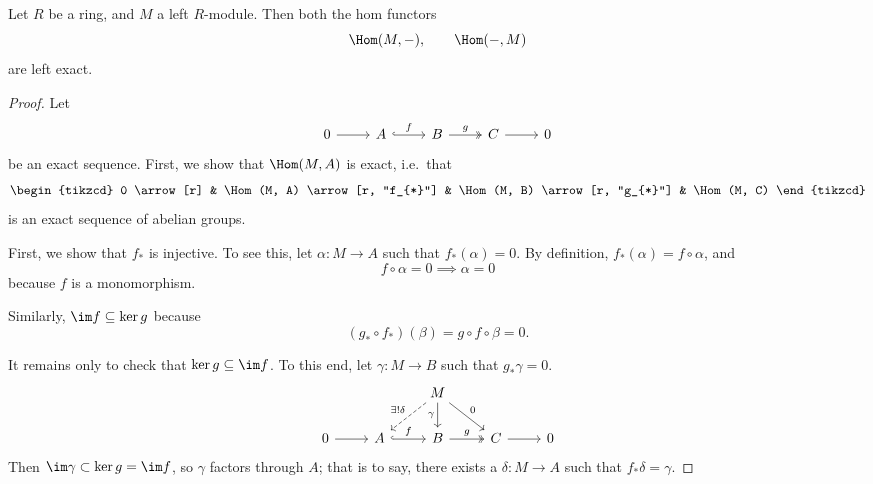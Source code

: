 \documentclass[main.tex]{subfiles}
\begin{document}
\begin{proposition}
  \label{prop:hom_functor_left_exact}
  Let $R$ be a ring, and $M$ a left $R$-module. Then both the hom functors
  \begin{equation*}
    \Hom(M, -),\qquad \Hom(-, M)
  \end{equation*}
  are left exact.
\end{proposition}
\begin{proof}
  Let
  \begin{equation*}
    \begin{tikzcd}
      0
      \arrow[r]
      & A
      \arrow[r, hookrightarrow, "f"]
      & B
      \arrow[r, twoheadrightarrow, "g"]
      & C
      \arrow[r]
      & 0
    \end{tikzcd}
  \end{equation*}
  be an exact sequence. First, we show that $\Hom(M, A)$ is exact, i.e.\ that
  \begin{equation*}
    \begin{tikzcd}
      0
      \arrow[r]
      & \Hom(M, A)
      \arrow[r, "f_{*}"]
      & \Hom(M, B)
      \arrow[r, "g_{*}"]
      & \Hom(M, C)
    \end{tikzcd}
  \end{equation*}
  is an exact sequence of abelian groups.

  First, we show that $f_{*}$ is injective. To see this, let $\alpha\colon M \to A$ such that $f_{*}(\alpha) = 0$. By definition, $f_{*}(\alpha) = f \circ \alpha$, and 
  \begin{equation*}
    f \circ \alpha = 0 \implies \alpha = 0
  \end{equation*}
  because $f$ is a monomorphism.

  Similarly, $\im f \subseteq \ker g$ because
  \begin{equation*}
    (g_{*} \circ f_{*})(\beta) = g \circ f \circ \beta = 0.
  \end{equation*}

  It remains only to check that $\ker g \subseteq \im f$. To this end, let $\gamma\colon M \to B$ such that $g_{*}\gamma = 0$.
  \begin{equation*}
    \begin{tikzcd}
      && M
      \arrow[d, swap, "\gamma"]
      \arrow[dr, "0"]
      \arrow[dl, swap, dashed, "\exists!\delta"]
      \\
      0
      \arrow[r]
      & A
      \arrow[r, hookrightarrow, "f"]
      & B
      \arrow[r, twoheadrightarrow, "g"]
      & C
      \arrow[r]
      & 0
    \end{tikzcd}
  \end{equation*}
  Then $\im \gamma \subset \ker g = \im f$, so $\gamma$ factors through $A$; that is to say, there exists a $\delta\colon M \to A$ such that $f_{*}\delta = \gamma$.
\end{proof}
\end{document}
